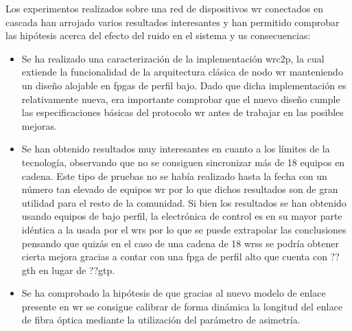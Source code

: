 Los experimentos realizados sobre una red de dispositivos \gls{wr} conectados 
en cascada han arrojado varios resultados interesantes y han permitido 
comprobar las hipótesis acerca del efecto del ruido en el sistema y us 
consecuencias:

\begin{itemize}
	\item Se ha realizado una caracterización de la implementación \gls{wrc2p}, 
	la cual extiende la funcionalidad de la arquitectura clásica de nodo 
	\gls{wr} manteniendo un diseño alojable en \gls{fpga}s de perfil bajo. Dado 
	que dicha implementación es relativamente nueva, era importante comprobar 
	que el nuevo diseño cumple las especificaciones básicas del protocolo  
	\gls{wr} antes de trabajar en las posibles mejoras.
	
	\item Se han obtenido resultados muy interesantes en cuanto a los límites 
	de la tecnología, observando que no se consiguen sincronizar más de 18 
	equipos en cadena. Este tipo de pruebas no se había realizado hasta la 
	fecha con un número tan elevado de equipos \gls{wr} por lo que dichos 
	resultados son de gran utilidad para el resto de la comunidad. Si bien los 
	resultados se han obtenido usando equipos de bajo perfil, la electrónica de 
	control es en su mayor parte idéntica a la usada por el \gls{wrs} por lo 
	que se puede extrapolar las conclusiones pensando que quizás en el caso de 
	una cadena de 18 \gls{wrs}s se podría obtener cierta mejora gracias a 
	contar con una \gls{fpga} de perfil alto que cuenta con ??gth en lugar 
	de ??gtp.
	
	\item Se ha comprobado la hipótesis de que gracias al nuevo modelo de 
	enlace presente en \gls{wr} se consigue calibrar de forma dinámica la 
	longitud del enlace de fibra óptica mediante la utilización del parámetro 
	de asimetría.
\end{itemize}

